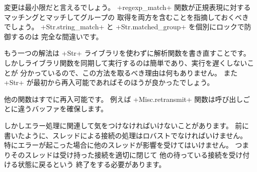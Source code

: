 変更は最小限だと言えるでしょう。
\ml+regexp_match+ 関数が正規表現に対するマッチングとマッチしてグループの
取得を両方を含むことを指摘しておくべきでしょう。
\ml+Str.string_match+ と \ml+Str.matched_group+ を個別にロックで防御するのは
完全な間違いです。

もう一つの解法は \ml+Str+ ライブラリを使わずに解析関数を書き直すことです。
しかしライブラリ関数を同期して実行するのは簡単であり、実行を遅くしないことが
分かっているので、この方法を取るべき理由は何もありません。
また \ml+Str+ が最初から再入可能であればそのほうが良かったでしょう。

他の関数はすでに再入可能です。
例えば \ml+Misc.retransmit+ 関数は呼び出しごとに違うバッファを確保します。

しかしエラー処理に関連して気をつけなければいけないことがあります。
前に書いたように、スレッドによる接続の処理はロバストでなければいけません。
特にエラーが起こった場合に他のスレッドが影響を受けてはいけません。
つまりそのスレッドは受け持った接続を適切に閉じて
他の待っている接続を受け付ける状態に戻るという  終了をする必要があります。

